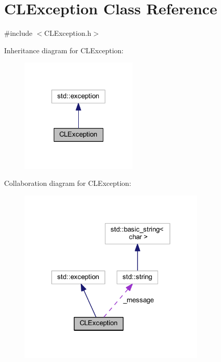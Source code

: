 \hypertarget{class_c_l_exception}{\section{C\-L\-Exception Class Reference}
\label{class_c_l_exception}
}


{\ttfamily \#include $<$C\-L\-Exception.\-h$>$}



Inheritance diagram for C\-L\-Exception\-:
\nopagebreak
\begin{figure}[H]
\begin{center}
\leavevmode
\includegraphics[width=158pt]{class_c_l_exception__inherit__graph}
\end{center}
\end{figure}


Collaboration diagram for C\-L\-Exception\-:
\nopagebreak
\begin{figure}[H]
\begin{center}
\leavevmode
\includegraphics[width=253pt]{class_c_l_exception__coll__graph}
\end{center}
\end{figure}
